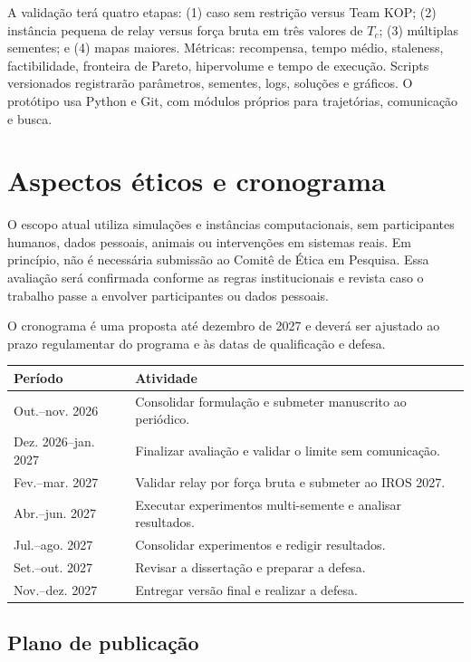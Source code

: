 \documentclass[mscproposta,portugues]{ppgccufmg}
\begin{document}
A validação terá quatro etapas: (1) caso sem restrição versus Team KOP; (2) instância pequena de relay versus força bruta em três valores de $T_c$; (3) múltiplas sementes; e (4) mapas maiores. Métricas: recompensa, tempo médio, staleness, factibilidade, fronteira de Pareto, hipervolume e tempo de execução. Scripts versionados registrarão parâmetros, sementes, logs, soluções e gráficos. O protótipo usa Python e Git, com módulos próprios para trajetórias, comunicação e busca.

\section{Aspectos éticos e cronograma}

O escopo atual utiliza simulações e instâncias computacionais, sem participantes humanos, dados pessoais, animais ou intervenções em sistemas reais. Em princípio, não é necessária submissão ao Comitê de Ética em Pesquisa. Essa avaliação será confirmada conforme as regras institucionais e revista caso o trabalho passe a envolver participantes ou dados pessoais.

O cronograma é uma proposta até dezembro de 2027 e deverá ser ajustado ao prazo regulamentar do programa e às datas de qualificação e defesa.

\begin{center}
\small
\begin{tabular}{p{}p{}}
\toprule
\textbf{Período} & \textbf{Atividade} \\
\midrule
Out.–nov. 2026 & Consolidar formulação e submeter manuscrito ao periódico. \\
Dez. 2026–jan. 2027 & Finalizar avaliação e validar o limite sem comunicação. \\
Fev.–mar. 2027 & Validar relay por força bruta e submeter ao IROS 2027. \\
Abr.–jun. 2027 & Executar experimentos multi-semente e analisar resultados. \\
Jul.–ago. 2027 & Consolidar experimentos e redigir resultados. \\
Set.–out. 2027 & Revisar a dissertação e preparar a defesa. \\
Nov.–dez. 2027 & Entregar versão final e realizar a defesa. \\
\bottomrule
\end{tabular}
\end{center}

\subsection{Plano de publicação}
\end{document}
